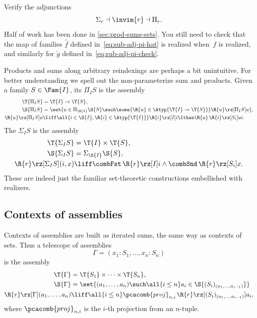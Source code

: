 \begin{exercise}
  Verify the adjunctions
  \begin{equation*}
    \Sigma_r \dashv \invim{r} \dashv \Pi_r.
  \end{equation*}
  Half of work has been done in \cref{sec:prod-sums-sets}.
  You still need to check that the map of families $\hat{f}$ defined in~\eqref{eq:sub-adj-pi-hat} is realized when~$f$ is realized, and similarly for $\check{g}$ defined in~\eqref{eq:sub-adj-pi-check}.
\end{exercise}

Products and sums along arbitrary reindexings are perhaps a bit unintuitive. For better understanding we spell out the non-parameterize sum and products.
%
Given a family $S \in \Fam{I}$, its  $\Pi_I S$ is the assembly
%
\begin{align*}
  \T{\Pi_I S} &= \T{I} \to \T{S}, \\
  \S{\Pi_I S} &= \textstyle
     \set{u \in \Pi_{\S{I}} \S{S} \such
          \some{\R{u} \in \Atyp{\T{I} \to \T{S}}} \R{u} \rz[\Pi_I S] u
     },\\
  \R{u} \rz[\Pi_I S] u &\liff
  \all{i \in \S{I}, \R{i} \in \Atyp{\T{I}}}
    \R{i} \rz[I] i \lthen \R{u}\,\R{i} \rz[S_i] u i.
\end{align*}
%
The  $\Sigma_I S$ is the assembly
%
\begin{align*}
  \T{\Sigma_I S} &= \T{I} \times \T{S}, \\
  \S{\Sigma_I S} &= \Sigma_{\S{I}} \S{S}, \\
  \R{r} \rz[\Sigma_I S] (i, x) &\liff
    \combFst\,\R{r} \rz[I] i \land
    \combSnd\,\R{r} \rz[S_i] x.
\end{align*}
%
These are indeed just the familiar set-theoretic constructions embellished with realizers.

\subsection{Contexts of assemblies}
\label{sec:contexts-assemblies}

Contexts of assemblies are built as iterated sums, the same way as contexts of sets.
Thus a telescope of assemblies
%
\begin{equation*}
  \Gamma = (x_1 : S_1, \ldots, x_n : S_n)
\end{equation*}
%
is the assembly
%
\begin{align*}
  \T{\Gamma} &= \T{S_1} \times \cdots \times \T{S_n}, \\
  \S{\Gamma} &= \set{(a_1, \ldots, a_n) \such \all{i \leq n} a_i \in \S{(S_i)_{(a_1, \ldots, a_{i-1})}}} \\
  \R{r} \rz[\Gamma] (a_1, \ldots, a_n)
  &\liff
  \all{i \leq n} \pcacomb{proj}_{n,i}\,\R{r} \rz[(S_i)_{(a_1, \ldots, a_{i-1})}] a_i,
\end{align*}
%
where $\pcacomb{proj}_{n,i}$ is the $i$-th projection from an $n$-tuple.

